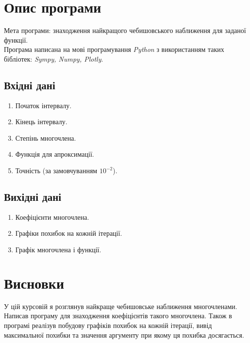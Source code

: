 \documentclass[ukrainian,14pt]{extarticle}
\begin{document}
\newpage

\section{Опис програми}

Мета програми: знаходження найкращого чебишовського наближення для заданої функції. \\
Програма написана на мові програмування \emph{Python} з використанням таких бібліотек: \emph{Sympy, Numpy, Plotly}.
\subsection{Вхідні дані}

\begin{enumerate}
\item Початок інтервалу.
\item Кінець інтервалу.
\item Степінь многочлена.
\item Функція для апроксимації.
\item Точність (за замовчуванням $10^{-2}$).
\end{enumerate}

\subsection{Вихідні дані}

\begin{enumerate}
\item Коефіцієнти многочлена.
\item Графіки похибок на кожній ітерації.
\item Графік многочлена і функції.

\end{enumerate}
\newpage

\section*{Висновки}
У цій курсовій я розглянув найкраще чебишовське наближення многочленами. Написав програму для знаходження коефіцієнтів такого многочлена. Також в програмі реалізув побудову графіків похибок на кожній ітерації, вивід максимальної похибки та значення аргументу при якому ця похибка досягається.
\end{document}
